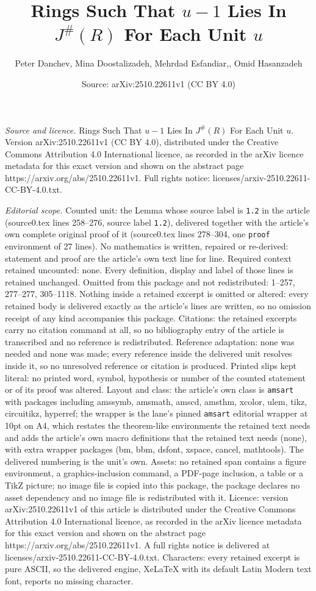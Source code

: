 \documentclass[10pt,a4paper]{amsart}
\title[Rings Such That $u-1$ Lies In $J^{\#}(R)$ For Each Unit $u$]{Rings Such That $u-1$ Lies In $J^{\#}(R)$ For Each Unit $u$}
\author{Peter Danchev, Mina Doostalizadeh, Mehrdad Esfandiar,, Omid Hasanzadeh}
\date{Source: arXiv:2510.22611v1 (CC BY 4.0)}
\begin{document}
\maketitle

\noindent\emph{Source and licence.} Rings Such That $u-1$ Lies In $J^{\#}(R)$ For Each Unit $u$. Version arXiv:2510.22611v1 (CC BY 4.0), distributed under the Creative Commons Attribution 4.0 International licence, as recorded in the arXiv licence metadata for this exact version and shown on the abstract page https://arxiv.org/abs/2510.22611v1. Full rights notice: licenses/arxiv-2510.22611-CC-BY-4.0.txt.\par\smallskip

\noindent\textit{Editorial scope.} Counted unit: the Lemma whose source label is \texttt{1.2} in the article (source0.tex lines 258--276, source label \texttt{1.2}), delivered together with the article's own complete original proof of it (source0.tex lines 278--304, one \texttt{proof} environment of 27 lines). No mathematics is written, repaired or re-derived: statement and proof are the article's own text line for line. Required context retained uncounted: none. Every definition, display and label of those lines is retained unchanged. Omitted from this package and not redistributed: 1--257, 277--277, 305--1118. Nothing inside a retained excerpt is omitted or altered: every retained body is delivered exactly as the article's lines are written, so no omission receipt of any kind accompanies this package. Citations: the retained excerpts carry no citation command at all, so no bibliography entry of the article is transcribed and no reference is redistributed. Reference adaptation: none was needed and none was made; every reference inside the delivered unit resolves inside it, so no unresolved reference or citation is produced. Printed slips kept literal: no printed word, symbol, hypothesis or number of the counted statement or of its proof was altered. Layout and class: the article's own class is \texttt{amsart} with packages including amssymb, amsmath, amscd, amsthm, xcolor, ulem, tikz, circuitikz, hyperref; the wrapper is the lane's pinned \texttt{amsart} editorial wrapper at 10pt on A4, which restates the theorem-like environments the retained text needs and adds the article's own macro definitions that the retained text needs (none), with extra wrapper packages (bm, bbm, dsfont, xspace, cancel, mathtools). The delivered numbering is the unit's own. Assets: no retained span contains a figure environment, a graphics-inclusion command, a PDF-page inclusion, a table or a TikZ picture; no image file is copied into this package, the package declares no asset dependency and no image file is redistributed with it. Licence: version arXiv:2510.22611v1 of this article is distributed under the Creative Commons Attribution 4.0 International licence, as recorded in the arXiv licence metadata for this exact version and shown on the abstract page https://arxiv.org/abs/2510.22611v1. A full rights notice is delivered at licenses/arxiv-2510.22611-CC-BY-4.0.txt. Characters: every retained excerpt is pure ASCII, so the delivered engine, XeLaTeX with its default Latin Modern text font, reports no missing character.
\end{document}
